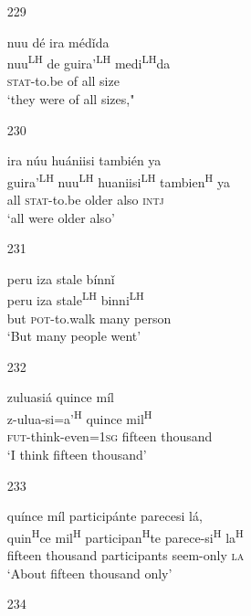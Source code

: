 \begin{itemize}
\item[229]
 
\glll   nuu d\'{e} ira m\'{e}d\v{i}da \\
nuu\textsuperscript{LH} de guira'\textsuperscript{LH} medi\textsuperscript{LH}da \\
 \textsc{stat}-to.be of all size  \\
\glt  `they were of all sizes,"
 


\item[230]
 
\glll   ira n\'{u}u hu\'{a}niisi tambi\'{e}n ya \\
 guira'\textsuperscript{LH} nuu\textsuperscript{LH} huaniisi\textsuperscript{LH} tambien\textsuperscript{H} ya \\
 all \textsc{stat}-to.be older also \textsc{intj} \\
\glt `all were older also'
 



\item[231]
 
\glll   peru iza stale b\'{i}nn\v{i}  \\
peru iza stale\textsuperscript{LH} binni\textsuperscript{LH} \\
but \textsc{pot}-to.walk many person \\
\glt `But many people went'
 


\item[232]
 
\glll   zuluasi\'{a} quince m\'{i}l \\
z-ulua-si=a'\textsuperscript{H} quince mil\textsuperscript{H}\\
 \textsc{fut}-think-even=\textsc{1sg} fifteen thousand \\
\glt `I think fifteen thousand'
 


\item[233]
 
\glll   qu\'{i}nce m\'{i}l particip\'{a}nte parecesi l\'{a}, \\
 quin\textsuperscript{H}ce mil\textsuperscript{H} participan\textsuperscript{H}te parece-si\textsuperscript{H} la\textsuperscript{H}  \\
fifteen thousand participants seem-only \textsc{la} \\
\glt `About fifteen thousand only'
 


\item[234]
 

\end{itemize}
